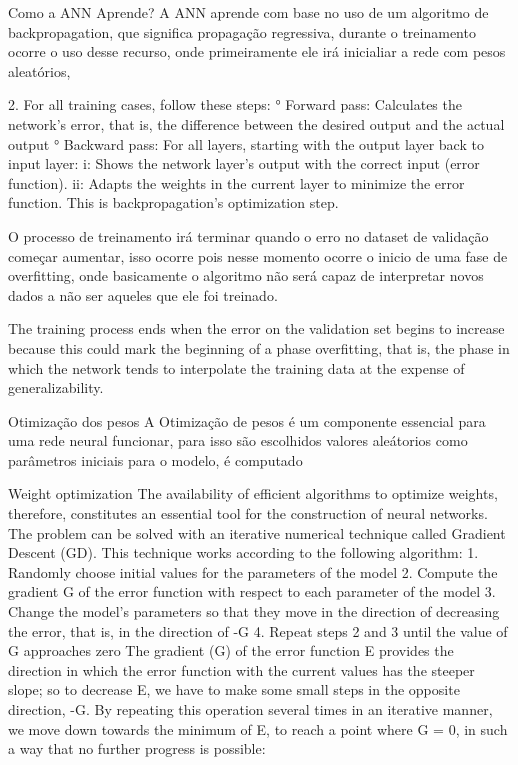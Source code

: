 Como a ANN Aprende?
A ANN aprende com base no uso de um algoritmo de backpropagation, que significa propagação regressiva, durante o treinamento ocorre o uso desse recurso, onde primeiramente ele irá inicialiar a rede com pesos aleatórios,

2. For all training cases, follow these steps:
° Forward pass: Calculates the network's error, that is, the difference 
between the desired output and the actual output
° Backward pass: For all layers, starting with the output layer back to 
input layer:
i: Shows the network layer's output with the correct input (error 
function).
ii: Adapts the weights in the current layer to minimize the error 
function. This is backpropagation's optimization step.

O processo de treinamento irá terminar quando o erro no dataset de validação começar aumentar, isso ocorre pois nesse momento ocorre o inicio de uma fase de overfitting, onde basicamente o algoritmo não será capaz de interpretar novos dados a não ser aqueles que ele foi treinado.

The training process ends when the error on the validation set begins to increase 
because this could mark the beginning of a phase overfitting, that is, the phase 
in which the network tends to interpolate the training data at the expense of 
generalizability.

Otimização dos pesos
A Otimização de pesos é um componente essencial para uma rede neural funcionar, para isso são escolhidos valores aleátorios como parâmetros iniciais para o modelo, é computado



Weight optimization
The availability of efficient algorithms to optimize weights, therefore, constitutes an 
essential tool for the construction of neural networks. The problem can be solved 
with an iterative numerical technique called Gradient Descent (GD). This technique
works according to the following algorithm:
1. Randomly choose initial values for the parameters of the model
2. Compute the gradient G of the error function with respect to each parameter 
of the model
3. Change the model's parameters so that they move in the direction of 
decreasing the error, that is, in the direction of -G
4. Repeat steps 2 and 3 until the value of G approaches zero
The gradient (G) of the error function E provides the direction in which the error 
function with the current values has the steeper slope; so to decrease E, we have to 
make some small steps in the opposite direction, -G.
By repeating this operation several times in an iterative manner, we move down
towards the minimum of E, to reach a point where G = 0, in such a way that no 
further progress is possible:


